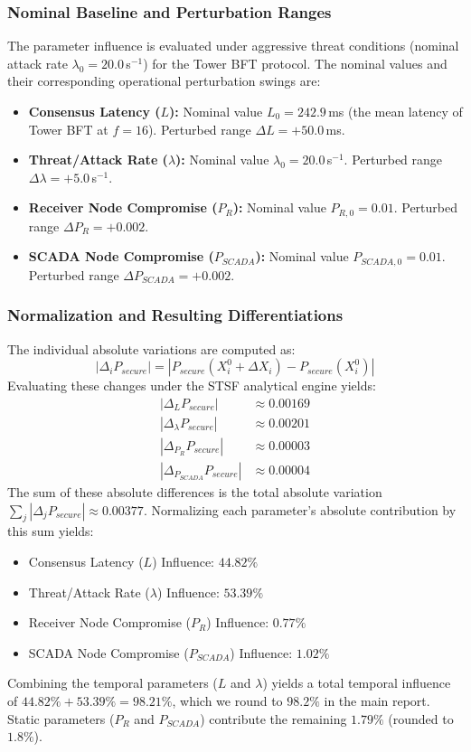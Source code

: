 \documentclass[10pt,twocolumn,letterpaper]{article}
\begin{document}
\subsubsection{Nominal Baseline and Perturbation Ranges}
The parameter influence is evaluated under aggressive threat conditions (nominal attack rate $\lambda_0 = 20.0$\,s$^{-1}$) for the Tower BFT protocol. The nominal values and their corresponding operational perturbation swings are:
\begin{itemize}[leftmargin=*]
    \item \textbf{Consensus Latency ($L$):} Nominal value $L_0 = 242.9$\,ms (the mean latency of Tower BFT at $f=16$). Perturbed range $\Delta L = +50.0$\,ms.
    \item \textbf{Threat/Attack Rate ($\lambda$):} Nominal value $\lambda_0 = 20.0$\,s$^{-1}$. Perturbed range $\Delta \lambda = +5.0$\,s$^{-1}$.
    \item \textbf{Receiver Node Compromise ($P_R$):} Nominal value $P_{R,0} = 0.01$. Perturbed range $\Delta P_R = +0.002$.
    \item \textbf{SCADA Node Compromise ($P_{SCADA}$):} Nominal value $P_{SCADA,0} = 0.01$. Perturbed range $\Delta P_{SCADA} = +0.002$.
\end{itemize}

\subsubsection{Normalization and Resulting Differentiations}
The individual absolute variations are computed as:
\begin{equation}
|\Delta_i P_{secure}| = |P_{secure}(X_i^0 + \Delta X_i) - P_{secure}(X_i^0)|
\end{equation}
Evaluating these changes under the STSF analytical engine yields:
\begin{align}
|\Delta_L P_{secure}| &\approx 0.00169 \\
|\Delta_\lambda P_{secure}| &\approx 0.00201 \\
|\Delta_{P_R} P_{secure}| &\approx 0.00003 \\
|\Delta_{P_{SCADA}} P_{secure}| &\approx 0.00004
\end{align}
The sum of these absolute differences is the total absolute variation $\sum_j |\Delta_j P_{secure}| \approx 0.00377$. Normalizing each parameter's absolute contribution by this sum yields:
\begin{itemize}[leftmargin=*]
    \item Consensus Latency ($L$) Influence: $44.82\%$
    \item Threat/Attack Rate ($\lambda$) Influence: $53.39\%$
    \item Receiver Node Compromise ($P_R$) Influence: $0.77\%$
    \item SCADA Node Compromise ($P_{SCADA}$) Influence: $1.02\%$
\end{itemize}
Combining the temporal parameters ($L$ and $\lambda$) yields a total temporal influence of $44.82\% + 53.39\% = 98.21\%$, which we round to $98.2\%$ in the main report. Static parameters ($P_R$ and $P_{SCADA}$) contribute the remaining $1.79\%$ (rounded to $1.8\%$).
\end{document}
